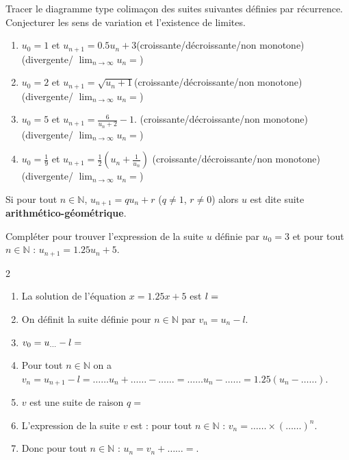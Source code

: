 \documentclass[main.tex]{subfiles}
\begin{document}
\begin{exercise}\label{chapter05:exercise:suites30}  Tracer le diagramme type colimaçon des suites suivantes définies par récurrence. Conjecturer les sens de variation et l'existence de limites.
\begin{enumerate}[label=\arabic*),leftmargin=*]
	\item $u_0=1$ et $u_{n+1}=0.5u_n+3$\dotfill (croissante/décroissante/non monotone)\dotfill (divergente/ $\lim_{n\to\infty}u_n=$\dotfill) 
	\item  $u_0 = 2$ et $u_{n+1} =\sqrt{u_n+1}$\dotfill (croissante/décroissante/non monotone)\dotfill (divergente/ $\lim_{n\to\infty}u_n=$\dotfill) 
	\item $u_0=5$ et $u_{n+1}=\frac{6}{u_n+2}-1$.  \dotfill (croissante/décroissante/non monotone)\dotfill (divergente/ $\lim_{n\to\infty}u_n=$\dotfill)  
	\item  $u_0 =\frac{1}{9}$ et $u_{n+1} =\frac{1}{2}\left( u_n+\frac{1}{u_n}\right)$ \dotfill (croissante/décroissante/non monotone)\dotfill (divergente/ $\lim_{n\to\infty}u_n=$\dotfill)  
\end{enumerate} 
\end{exercise}
\begin{eBox} Si pour tout $n\in\mathbb{N}$,  $u_{n+1}=qu_n+r$ ($q\neq 1$, $r\neq 0$)  alors $u$ est dite  suite \textbf{arithmético-géométrique}. 
\end{eBox}
\begin{exercise}\label{chapter05:exercise:suites31} Compléter pour trouver l'expression de la suite $u$ définie par $u_0=3$ et pour tout $n\in\mathbb{N}$ : $u_{n+1}=1.25 u_n + 5$. 
\begin{spacing}{2}
	\begin{enumerate}[label={},leftmargin=*]
		\item La solution de l'équation $x=1.25 x+5$ est  $l=\dotfill $  
		\item On définit la suite définie pour $n\in\mathbb{N}$ par $v_{n}=u_{n}-l$. 
	 	\item $v_0=u_{...}-l= \dotfill $
		\item Pour tout $n\in\mathbb{N}$ on a $v_n=u_{n+1}-l=  \ldots\ldots u_n + \ldots\ldots - \ldots\ldots = \ldots\ldots u_n - \ldots\ldots = 1.25(u_n-\ldots\ldots)$.
		\item $v$ est une suite \dotfill de raison $q= $\dotfill 
		\item L'expression de la suite $v$ est : pour tout $n\in\mathbb{N}$ : $v_n=\ldots\ldots\times (\ldots\ldots)^{n}$. 
		\item Donc pour tout $n\in\mathbb{N}$ : $u_n= v_n + \ldots\ldots = $\dotfill.
	\end{enumerate}
\end{spacing}
\end{exercise}
\end{document}
